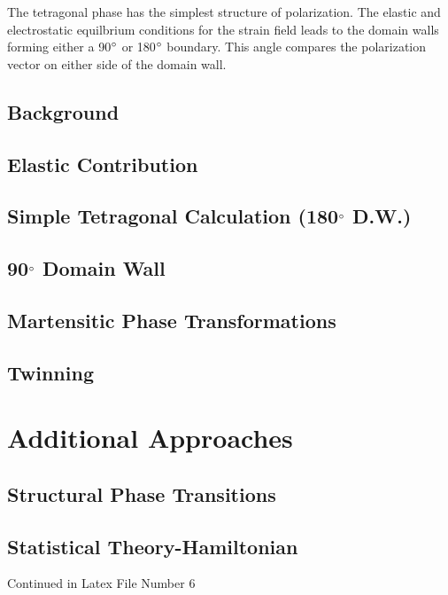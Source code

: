 \documentclass{article}
\begin{document}
\indent The tetragonal phase has the simplest structure of polarization.  The elastic and electrostatic equilbrium conditions for the strain field leads to the domain walls forming either a 90$\degree $ or 180$\degree$ boundary.   This angle compares the polarization vector on either side of the domain wall.

\subsection{Background}
\subsection{Elastic Contribution}
\subsection{Simple Tetragonal Calculation (180$\degree$ D.W.)}
\subsection{90$\degree$ Domain Wall}
\subsection{Martensitic Phase Transformations}
\subsection{Twinning}
\section{Additional Approaches}
\subsection{Structural Phase Transitions}
\subsection{Statistical Theory-Hamiltonian}

Continued in Latex File  Number 6
\end{document}
